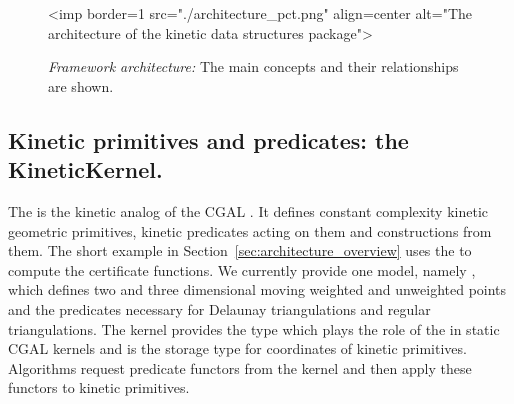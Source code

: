 \begin{figure}[htb]
\begin{ccHtmlOnly}
<imp border=1 src="./architecture_pct.png" align=center alt="The architecture of the kinetic data structures package">
\end{ccHtmlOnly}
\caption{ \label{fig:architecture} 
{\em Framework architecture:} The main concepts and their relationships are shown. }
\end{figure}



\subsection{Kinetic primitives and predicates: the KineticKernel.}
\label{sec:kinetic_kernel}

The  is the kinetic analog of the CGAL
. It defines constant complexity kinetic geometric
primitives, kinetic predicates acting on them and constructions from
them. The short example in Section~\ref{sec:architecture_overview}
uses the  to compute the 
certificate functions. We currently provide one model, namely
, which
defines two and three dimensional moving weighted and unweighted
points and the predicates necessary for Delaunay triangulations and
regular triangulations. The kernel provides the type 
which plays the role of the  in static
CGAL kernels and is the storage type for coordinates of kinetic
primitives. Algorithms request predicate functors from the kernel and
then apply these functors to kinetic primitives.

